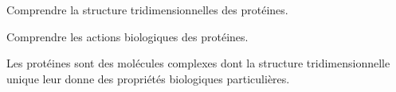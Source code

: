 \teteTermStssBiom

\vspace*{-40pt}

\begin{objectifs}
  \item Comprendre la structure tridimensionnelles des protéines.
  \item Comprendre les actions biologiques des protéines.
\end{objectifs}

\begin{contexte}
  Les protéines sont des molécules complexes dont la structure tridimensionnelle unique leur donne des propriétés biologiques particulières.
  
\end{contexte}


